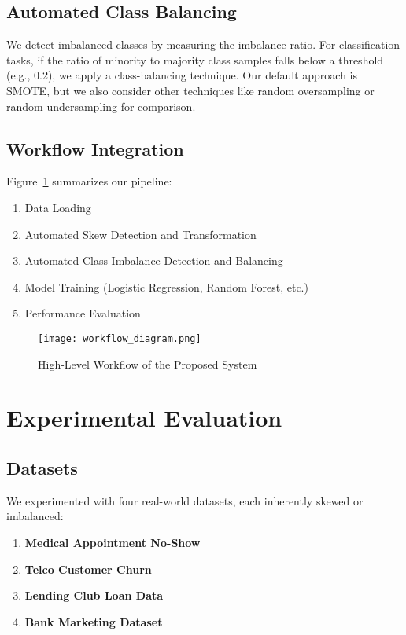 \documentclass[11pt]{article}
\begin{document}
\subsection{Automated Class Balancing}
We detect imbalanced classes by measuring the imbalance ratio. 
For classification tasks, if the ratio of minority to majority class samples falls below a threshold (e.g., 0.2), 
we apply a class-balancing technique. 
Our default approach is SMOTE, 
but we also consider other techniques like random oversampling or random undersampling for comparison.

\subsection{Workflow Integration}
Figure~\ref{fig:workflow} summarizes our pipeline:
\begin{enumerate}
    \item Data Loading
    \item Automated Skew Detection and Transformation
    \item Automated Class Imbalance Detection and Balancing
    \item Model Training (Logistic Regression, Random Forest, etc.)
    \item Performance Evaluation
\end{enumerate}

\begin{figure}[h!]
    \centering
    \texttt{[image: workflow\_diagram.png]}
    \caption{High-Level Workflow of the Proposed System}
    \label{fig:workflow}
\end{figure}

\section{Experimental Evaluation}
\subsection{Datasets}
We experimented with four real-world datasets, each inherently skewed or imbalanced:
\begin{enumerate}
    \item \textbf{Medical Appointment No-Show} \cite{medical_noshow}
    \item \textbf{Telco Customer Churn} \cite{telco_churn}
    \item \textbf{Lending Club Loan Data} \cite{lending_club}
    \item \textbf{Bank Marketing Dataset} \cite{bank_marketing}
\end{enumerate}
\end{document}
